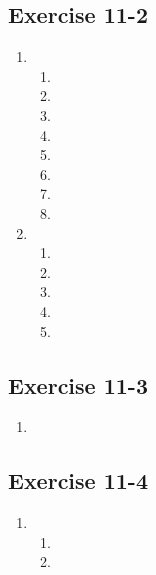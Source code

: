 \subsection{Exercise 11-2} %
 \begin{enumerate}[itemsep=5pt, label=\textbf{\arabic*}. ]
  \item %
\begin{enumerate}[noitemsep, label=\textbf{(\alph*)} ]
\item
\item
\item
\item
\item
\item
\item
\item
\end{enumerate}
\item %
\begin{enumerate}[noitemsep, label=\textbf{(\alph*)} ]

\item
\item
\item
\item
\item
\end{enumerate}

\end{enumerate}
\subsection{Exercise 11-3}
  \begin{enumerate}[itemsep=5pt, label=\textbf{\arabic*}. ]
 \item %
\end{enumerate}

\subsection{Exercise 11-4} %
  \begin{enumerate}[itemsep=5pt, label=\textbf{\arabic*}. ]
   \item
% 
\begin{enumerate}[noitemsep, label=\textbf{(\alph*)} ]
\item %
\item %
\end{enumerate}

\end{enumerate}

